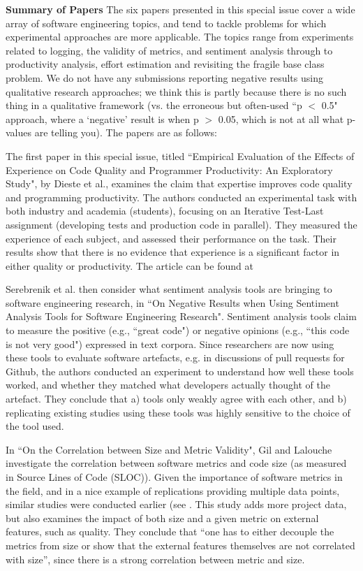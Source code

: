 \documentclass{svjour3}                     %
\begin{document}
\noindent\textbf{Summary of Papers} The six papers presented in this special issue cover a wide array of software engineering topics, and tend to tackle problems for which experimental approaches are more applicable. The topics range from experiments related to logging, the validity of metrics, and sentiment analysis through to productivity analysis, effort estimation and revisiting the fragile base class problem. We do not have any submissions reporting negative results using qualitative research approaches; we think this is partly because there is no such thing in a qualitative framework (vs. the erroneous but often-used ``p $<$ 0.5" approach, where a `negative' result is when p $>$ 0.05, which is not at all what p-values are telling you). The papers are as follows:

The first paper in this special issue, titled
``Empirical Evaluation of the Effects of Experience on Code Quality and Programmer Productivity: An Exploratory Study", by Dieste et al., examines the claim that expertise improves code quality and programming productivity. The authors conducted  an experimental task with both industry and academia (students), focusing on an Iterative Test-Last assignment (developing tests and production code in parallel). They measured the experience of each subject, and assessed their performance on the task. Their results show that there is no evidence that experience is a significant factor in either quality or productivity. The article can be found at

Serebrenik et al. then consider what sentiment analysis tools are bringing to software engineering research, in ``On Negative Results when Using Sentiment Analysis Tools for Software Engineering Research". Sentiment analysis tools claim to measure the positive (e.g., ``great code") or negative opinions (e.g., ``this code is not very good") expressed in text corpora. Since researchers are now using these tools to evaluate software artefacts, e.g. in discussions of pull requests for Github, the authors conducted an experiment to understand how well these tools worked, and whether they matched what developers actually thought of the artefact. They conclude that a) tools only weakly agree with each other, and b) replicating existing studies using these tools was highly sensitive to the choice of the tool used.

In ``On the Correlation between Size and Metric Validity", Gil and Lalouche investigate the correlation between software metrics and code size (as measured in Source Lines of Code (SLOC)). Given the importance of software metrics in the field,  and in a nice example of replications providing multiple data points, similar studies were conducted earlier (see \cite{shepperd,herraiz}. This study adds more project data, but also examines the impact of both size and a given metric on external features, such as quality. They conclude that ``one has to either decouple the metrics from size or show that the external features themselves are not correlated with size'', since there is a strong correlation between metric and size.
\end{document}
